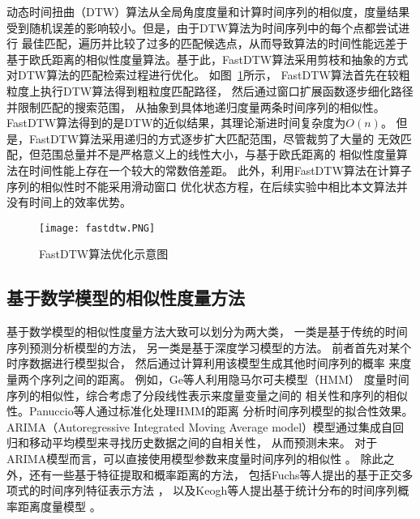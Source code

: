 动态时间扭曲（DTW）算法从全局角度度量和计算时间序列的相似度，度量结果
受到随机误差的影响较小。但是，由于DTW算法为时间序列中的每个点都尝试进行
最佳匹配，遍历并比较了过多的匹配候选点，从而导致算法的时间性能远差于
基于欧氏距离的相似性度量算法。基于此，FastDTW算法采用剪枝和抽象的方式
对DTW算法的匹配检索过程进行优化\cite{DBLP:journals/ida/SalvadorC07}。
如图~\ref{fig:fastdtw}所示，
FastDTW算法首先在较粗粒度上执行DTW算法得到粗粒度匹配路径，
然后通过窗口扩展函数逐步细化路径并限制匹配的搜索范围，
从抽象到具体地递归度量两条时间序列的相似性。
FastDTW算法得到的是DTW的近似结果，其理论渐进时间复杂度为$O(n)$。
但是，FastDTW算法采用递归的方式逐步扩大匹配范围，尽管裁剪了大量的
无效匹配，但范围总量并不是严格意义上的线性大小，与基于欧氏距离的
相似性度量算法在时间性能上存在一个较大的常数倍差距。
此外，利用FastDTW算法在计算子序列的相似性时不能采用滑动窗口
优化状态方程，在后续实验中相比本文算法并没有时间上的效率优势。

\begin{figure}
  \centering
  \texttt{[image: fastdtw.PNG]}
  \caption{FastDTW算法优化示意图}
  \label{fig:fastdtw}
\end{figure}

\subsection{基于数学模型的相似性度量方法}
基于数学模型的相似性度量方法大致可以划分为两大类，
一类是基于传统的时间序列预测分析模型的方法，
另一类是基于深度学习模型的方法。
前者首先对某个时序数据进行模型拟合，
然后通过计算利用该模型生成其他时间序列的概率
来度量两个序列之间的距离。
例如，Ge等人利用隐马尔可夫模型（HMM）\cite{DBLP:conf/kdd/GeS00}
度量时间序列的相似性，综合考虑了分段线性表示来度量变量之间的
相关性和序列的相似性。Panuccio等人通过标准化处理HMM的距离
分析时间序列模型的拟合性效果\cite{DBLP:conf/sspr/PanuccioBM02}。
ARIMA（Autoregressive Integrated Moving Average model）模型通过集成自回归和移动平均模型来寻找历史数据之间的自相关性，
从而预测未来\cite{DBLP:conf/aaai/LiuHZS16}。
对于ARIMA模型而言，可以直接使用模型参数来度量时间序列的相似性
\cite{DBLP:conf/icdm/KalpakisGP01}。
除此之外，还有一些基于特征提取和概率距离的方法，
包括Fuchs等人提出的基于正交多项式的时间序列特征表示方法
\cite{DBLP:journals/ijon/FuchsGPS10}，
以及Keogh等人提出基于统计分布的时间序列概率距离度量模型
\cite{DBLP:conf/kdd/KeoghS97}。


